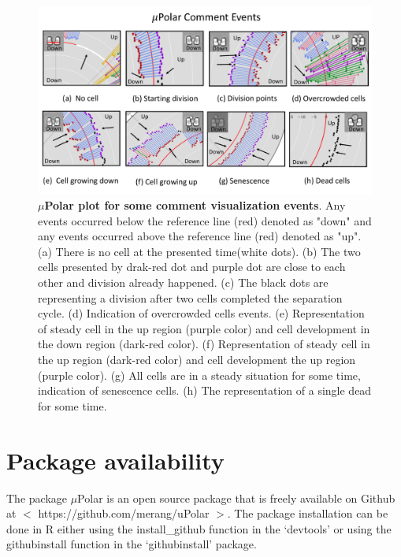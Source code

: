\documentclass[conference]{IEEEtran}
\begin{document}
\begin{figure}
\centering
\includegraphics[width=\textwidth,height=10 cm]{Patterns/read.pdf}
\caption{\textbf{ $\mu$Polar plot for some comment visualization events}. Any events occurred below the reference line (red) denoted as "down" and any events occurred above the reference line (red) denoted as "up". (a) There is no cell at the presented time(white dots). (b) The two cells presented by  drak-red dot and purple dot are close to each other and division already happened. (c) The black dots are representing a division after two cells completed the separation cycle. (d) Indication of overcrowded cells events. (e) Representation of steady cell in the up region (purple color) and cell development in the down region (dark-red color). (f)  Representation of steady cell in the up region (dark-red color) and cell development the up region (purple color). (g) All cells are in a steady situation for some time, indication of senescence cells. (h) The representation of a single dead for some time.}
\label{fig:read}
\end{figure}


\section{Package availability}
The package $\mu$Polar is an open source package that is freely available on Github at $<$ https://github.com/merang/uPolar $>$. The package installation can be done in R either using the install\_github function in the ‘devtools’ or using the githubinstall function in the ‘githubinstall’ package. 
\end{document}
